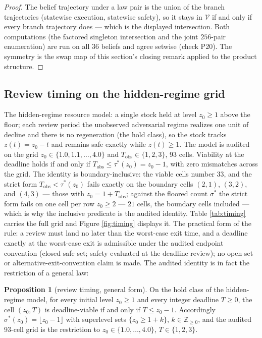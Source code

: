 \documentclass[10pt,twocolumn]{article}
\theoremstyle{definition}
\newtheorem{proposition}{Proposition}
\begin{document}
\begin{proof}
The belief trajectory under a law pair is the union of the branch
trajectories (statewise execution, statewise safety), so it stays in
\(\mathcal{V}\) if and only if every branch trajectory does --- which is
the displayed intersection. Both computations (the factored singleton
intersection and the joint \(256\)-pair enumeration) are run on all
\(36\) beliefs and agree setwise (check P20). The symmetry is the swap
map of this section's closing remark applied to the product structure.
\end{proof}

\subsection{Review timing on the hidden-regime grid}\label{timing}

The hidden-regime resource model: a single stock held at level
\(z_0 \ge 1\) above the floor; each review period the unobserved
adversarial regime realizes one unit of decline and there is no
regeneration (the hold class), so the stock tracks \(z(t) = z_0 - t\)
and remains safe exactly while \(z(t) \ge 1\). The model is audited on
the grid \(z_0 \in \{1.0, 1.1, \dots, 4.0\}\) and
\(T_{\mathrm{obs}} \in \{1, 2, 3\}\), 93 cells. Viability at the
deadline holds if and only if
\(T_{\mathrm{obs}} \le \tau^{*}(z_0) = z_0 - 1\), with zero
mismatches across the grid. The identity is boundary-inclusive: the
viable cells number \(33\), and the strict form \(T_{\mathrm{obs}} <
\tau^{*}(z_0)\) fails exactly on the boundary cells \((2,1)\),
\((3,2)\), and \((4,3)\) --- those with \(z_0 = 1 +
T_{\mathrm{obs}}\); against the floored count \(\sigma^{*}\) the
strict form fails on one cell per row \(z_0 \ge 2\) --- \(21\) cells,
the boundary cells included --- which is why the
inclusive predicate is the audited identity.
Table \ref{tab:timing} carries the full grid and Figure
\ref{fig:timing} displays it. The practical form of the rule: a review
must land no later than the worst-case exit time, and a deadline exactly at the worst-case exit is admissible under the audited endpoint convention (closed safe set; safety evaluated at the deadline review); no open-set or alternative-exit-convention claim is made. The audited identity is in fact the
restriction of a general law:

\begin{proposition}[review timing, general form]\label{prop:timing}
On the hold class of the hidden-regime model, for every initial level
\(z_0 \ge 1\) and every integer deadline \(T \ge 0\), the cell
\((z_0, T)\) is deadline-viable if and only if \(T \le z_0 - 1\).
Accordingly \(\sigma^{*}(z_0) = \lfloor z_0 - 1 \rfloor\) with
superlevel sets \(\{z_0 \ge 1 + k\}\), \(k \in
\mathbb{Z}_{\ge 0}\), and the audited 93-cell grid is the restriction
to \(z_0 \in \{1.0, \dots, 4.0\}\), \(T \in \{1, 2, 3\}\).
\end{proposition}
\end{document}
